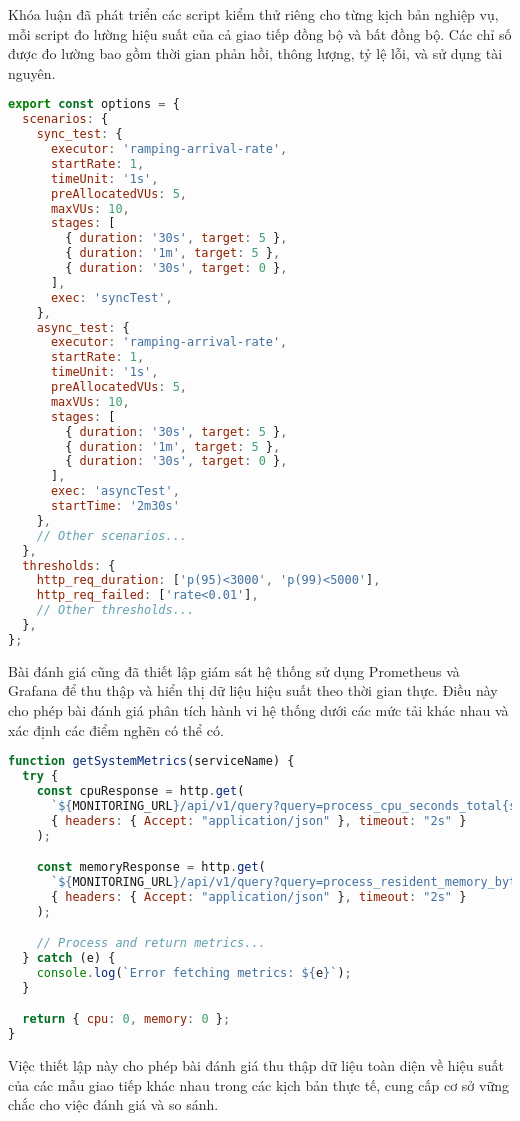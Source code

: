 Khóa luận đã phát triển các script kiểm thử riêng cho từng kịch bản nghiệp vụ, mỗi script đo lường hiệu suất của cả giao tiếp đồng bộ và bất đồng bộ. Các chỉ số được đo lường bao gồm thời gian phản hồi, thông lượng, tỷ lệ lỗi, và sử dụng tài nguyên.

\begin{lstlisting}[language=Javascript]
export const options = {
  scenarios: {
    sync_test: {
      executor: 'ramping-arrival-rate',
      startRate: 1,
      timeUnit: '1s',
      preAllocatedVUs: 5,
      maxVUs: 10,
      stages: [
        { duration: '30s', target: 5 },
        { duration: '1m', target: 5 },
        { duration: '30s', target: 0 },
      ],
      exec: 'syncTest',
    },
    async_test: {
      executor: 'ramping-arrival-rate',
      startRate: 1,
      timeUnit: '1s',
      preAllocatedVUs: 5,
      maxVUs: 10,
      stages: [
        { duration: '30s', target: 5 },
        { duration: '1m', target: 5 },
        { duration: '30s', target: 0 },
      ],
      exec: 'asyncTest',
      startTime: '2m30s'
    },
    // Other scenarios...
  },
  thresholds: {
    http_req_duration: ['p(95)<3000', 'p(99)<5000'],
    http_req_failed: ['rate<0.01'],
    // Other thresholds...
  },
};
\end{lstlisting}

Bài đánh giá cũng đã thiết lập giám sát hệ thống sử dụng Prometheus và Grafana để thu thập và hiển thị dữ liệu hiệu suất theo thời gian thực. Điều này cho phép bài đánh giá phân tích hành vi hệ thống dưới các mức tải khác nhau và xác định các điểm nghẽn có thể có.

\begin{lstlisting}[language=Javascript]
function getSystemMetrics(serviceName) {
  try {
    const cpuResponse = http.get(
      `${MONITORING_URL}/api/v1/query?query=process_cpu_seconds_total{service="${serviceName}"}`,
      { headers: { Accept: "application/json" }, timeout: "2s" }
    );

    const memoryResponse = http.get(
      `${MONITORING_URL}/api/v1/query?query=process_resident_memory_bytes{service="${serviceName}"}`,
      { headers: { Accept: "application/json" }, timeout: "2s" }
    );

    // Process and return metrics...
  } catch (e) {
    console.log(`Error fetching metrics: ${e}`);
  }

  return { cpu: 0, memory: 0 };
}
\end{lstlisting}

Việc thiết lập này cho phép bài đánh giá thu thập dữ liệu toàn diện về hiệu suất của các mẫu giao tiếp khác nhau trong các kịch bản thực tế, cung cấp cơ sở vững chắc cho việc đánh giá và so sánh.
